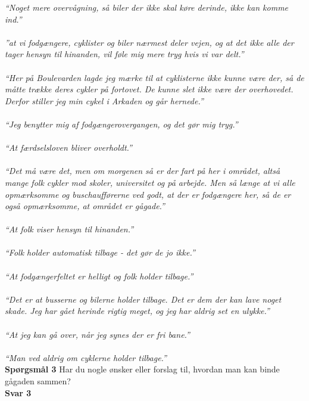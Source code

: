 \emph{“Noget mere overvågning, så biler der ikke skal køre derinde, ikke kan komme ind.”
\\\\
  ”at vi fodgængere, cyklister og biler nærmest deler vejen, og at det ikke alle der tager hensyn til hinanden, vil føle mig mere tryg hvis vi var delt.”
\\\\
  “Her på Boulevarden lagde jeg mærke til at cyklisterne ikke kunne være der, så de måtte trække deres cykler på fortovet. De kunne slet ikke være der overhovedet.  Derfor stiller jeg min cykel i Arkaden og går hernede.”
\\\\
  “Jeg benytter mig af fodgængerovergangen, og det gør mig tryg.”
\\\\
  “At færdselsloven bliver overholdt.”
\\\\
  “Det må være det, men om morgenen så er der fart på her i området, altså mange folk cykler mod skoler, universitet og på arbejde. Men så længe at vi alle opmærksomme og buschaufførerne ved godt, at der er fodgængere her, så de er også opmærksomme, at området er gågade.”
\\\\
  “At folk viser hensyn til hinanden.”
\\\\
  “Folk holder automatisk tilbage - det gør de jo ikke.”
\\\\
  “At fodgængerfeltet er helligt og folk holder tilbage.”
\\\\
  “Det er at busserne og bilerne holder tilbage. Det er dem der kan lave noget skade. Jeg har gået herinde rigtig meget, og jeg har aldrig set en ulykke.”
\\\\
  “At jeg kan gå over, når jeg synes der er fri bane.”
\\\\
  “Man ved aldrig om cyklerne holder tilbage.”}
  \\
  \textbf{Spørgsmål 3}
  Har du nogle ønsker eller forslag til, hvordan man kan binde gågaden sammen?
\\
  \textbf{Svar 3}
